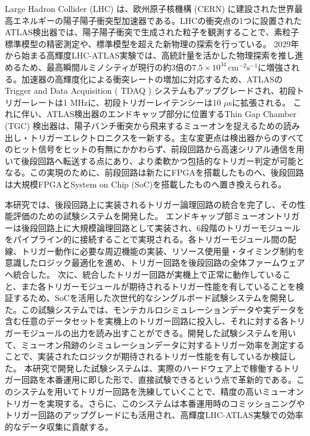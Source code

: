 Large Hadron Collider (LHC) は、欧州原子核機構 (CERN) に建設された世界最高エネルギーの陽子陽子衝突型加速器である。LHCの衝突点の1つに設置されたATLAS検出器では、陽子陽子衝突で生成された粒子を観測することで、素粒子標準模型の精密測定や、標準模型を超えた新物理の探索を行っている。
2029年から始まる高輝度LHC-ATLAS実験では、高統計量を活かした物理探索を推し進めるため、最高瞬間ルミノシティが現行の約3倍の$7.5 \times 10^{34}\, \mathrm{cm^{-2}s^{-1}}$に増強される。加速器の高輝度化による衝突レートの増加に対応するため、ATLASのTrigger and Data Acquisition ( TDAQ ) システムもアップグレードされ、初段トリガーレートは1 MHzに、初段トリガーレイテンシーは10 $\mu$sに拡張される。
これに伴い、ATLAS検出器のエンドキャップ部分に位置するThin Gap Chamber (TGC) 検出器は、陽子バンチ衝突から飛来するミューオンを捉えるための読み出し・トリガーエレクトロニクスを一新する。主な変更点は検出器からのすべてのヒット信号をヒットの有無にかかわらず、前段回路から高速シリアル通信を用いて後段回路へ転送する点にあり、より柔軟かつ包括的なトリガー判定が可能となる。この実現のために、前段回路は新たにFPGAを搭載したものへ、後段回路は大規模FPGAとSystem on Chip (SoC)を搭載したものへ置き換えられる。

本研究では、後段回路上に実装されるトリガー論理回路の統合を完了し、その性能評価のための試験システムを開発した。
エンドキャップ部ミューオントリガーは後段回路上に大規模論理回路として実装され、6段階のトリガーモジュールをパイプライン的に接続することで実現される。各トリガーモジュール間の配線、トリガー動作に必要な周辺機能の実装、リソース使用量・タイミング制約を意識したロジック最適化を進め、トリガー回路を後段回路の全体ファームウェアへ統合した。
次に、統合したトリガー回路が実機上で正常に動作していること、また各トリガーモジュールが期待されるトリガー性能を有していることを検証するため、SoCを活用した次世代的なシングルボード試験システムを開発した。この試験システムでは、モンテカルロシミュレーションデータや実データを含む任意のデータセットを実機上のトリガー回路に投入し、それに対する各トリガーモジュールの出力を読み出すことができる。開発した試験システムを用いて、ミューオン飛跡のシミュレーションデータに対するトリガー効率を測定することで、実装されたロジックが期待されるトリガー性能を有しているか検証した。
本研究で開発した試験システムは、実際のハードウェア上で稼働するトリガー回路を本番運用に即した形で、直接試験できるという点で革新的である。このシステムを用いてトリガー回路を洗練していくことで、精度の高いミューオントリガーを実現する。さらに、このシステムは本番運用時のコミッショニングやトリガー回路のアップグレードにも活用され、高輝度LHC-ATLAS実験での効率的なデータ収集に貢献する。

